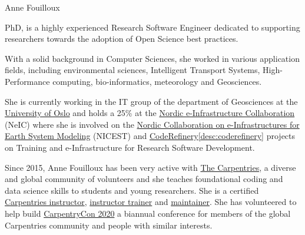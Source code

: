 \begin{participant}[type=R,PM=24,gender=female]{Anne Fouilloux}






  \medskip PhD, is a highly experienced Research Software Engineer dedicated to supporting
  researchers towards the adoption of Open Science best practices.

  With a solid background in Computer Sciences, she worked in various application fields, including environmental sciences, Intelligent Transport Systems, High-Performance computing, bio-informatics, meteorology and Geosciences.

  She is currently working in the IT group of the department of Geosciences at the \href{https://www.mn.uio.no/geo/english}{University of Oslo} and holds a 25\% at the \href{https://neic.no}{Nordic e-Infrastructure Collaboration} (NeIC) where she is involved on the \href{https://neic.no/nicest/}{Nordic Collaboration on e-Infrastructures for Earth System Modeling} (NICEST) and \href{https://coderefinery.org}{CodeRefinery}\ref{desc:coderefinery} projects on Training and e-Infrastructure for Research Software Development. 

   Since 2015, Anne Fouilloux has been very active with \href{https://carpentries.org}{The Carpentries}, a diverse and global community of volunteers and she teaches foundational coding and data science skills to students and young researchers. She is a certified \href{https://carpentries.org/instructors/}{Carpentries instructor}, \href{https://carpentries.org/trainers/}{instructor trainer} and \href{https://carpentries.org/maintainers/}{maintainer}. She has volunteered to help build \href{http://www.carpentrycon.org/}{CarpentryCon 2020} a biannual conference for members of the global Carpentries community and people with similar interests. 


\end{participant}
